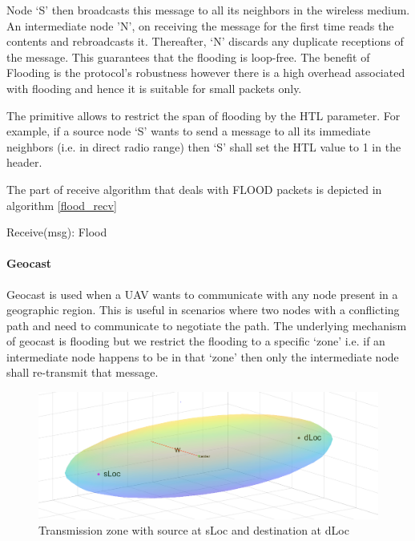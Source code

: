 Node `S' then broadcasts this message to all its neighbors in the wireless medium. An intermediate node 'N', on receiving the message for the first time reads the contents and rebroadcasts it. Thereafter, `N' discards any duplicate receptions of the message. This guarantees that the flooding is loop-free. The benefit of Flooding is the protocol's robustness however there is a high overhead associated with flooding and hence it is suitable for small packets only.

The primitive allows to restrict the span of flooding by the HTL parameter. For example, if a source node `S' wants to send a message to all its immediate neighbors (i.e. in direct radio range) then `S' shall set the HTL value to 1 in the header.

The part of receive algorithm that deals with FLOOD packets is depicted in algorithm \ref{flood_recv}

\begin{algorithm}
\caption{Receive(msg): Flood} 
\label{flood_recv}
\DontPrintSemicolon
{}

\end{algorithm}

\paragraph{Geocast}

Geocast is used when a UAV wants to communicate with any node present in a geographic region. This is useful in scenarios where two nodes with a conflicting path and need to communicate to negotiate the path. The underlying mechanism of geocast is flooding but we restrict the flooding to a specific `zone' i.e. if an intermediate node happens to be in that `zone' then only the intermediate node shall re-transmit that message.  

\begin{figure}[hbtp]
\centering
\includegraphics[width=1\textwidth]{Chapter-3/figs/Spheroid}
\caption{Transmission zone with source at sLoc and destination at dLoc}
\label{fig:spheroid}
\end{figure}

